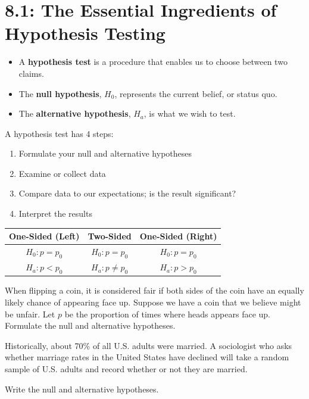 \documentclass[../mathNotesPreamble]{subfiles}
\providecommand{\relscalefact}{1.4}
\begin{document}
\relscale{\relscalefact}
  \section{8.1: The Essential Ingredients of Hypothesis Testing}
    \begin{defn*}
      \begin{itemize}
        \item A \textbf{hypothesis test} is a procedure that enables us to choose between two claims.
        \item The \textbf{null hypothesis}, $H_0$, represents the current belief, or status quo.
        \item The \textbf{alternative hypothesis}, $H_a$, is what we wish to test.
      \end{itemize}
      A hypothesis test has 4 steps:
      \begin{enumerate}
        \item Formulate your null and alternative hypotheses
        \item Examine or collect data
        \item Compare data to our expectations; is the result significant?
        \item Interpret the results
      \end{enumerate}
    \end{defn*}
    \begin{center}
      \begin{tabular}{@{}ccc@{}}\toprule
        One-Sided (Left)& Two-Sided& One-Sided (Right)\\\midrule
        $H_0: p=p_0$& $H_0: p=p_0$& $H_0: p=p_0$\\
        $H_a: p<p_0$& $H_a: p\neq p_0$& $H_a: p> p_0$\\\bottomrule
      \end{tabular}
    \end{center}

    \begin{ex*}
      When flipping a coin, it is considered fair if both sides of the coin have an equally likely chance of appearing face up. Suppose we have a coin that we believe might be unfair. Let $p$ be the proportion of times where heads appears face up. Formulate the null and alternative hypotheses.
    \end{ex*}
    \pagebreak

    \begin{ex*}
      Historically, about 70\% of all U.S. adults were married. A sociologist who asks whether marriage rates in the United States have declined will take a random sample of U.S. adults and record whether or not they are married.

      Write the null and alternative hypotheses.
    \end{ex*}
\end{document}
